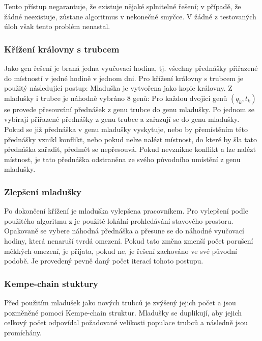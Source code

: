 \documentclass[12pt, a4paper]{article}
\begin{document}
Tento přístup negarantuje, že existuje nějaké splnitelné řešení; v případě, že žádné neexistuje, zůstane algoritmus v nekonečné smyčce.
V žádné z testovaných úloh však tento problém nenastal.

\subsubsection{Křížení královny s trubcem}
Jako gen řešení je braná jedna vyučovací hodina, tj. všechny přednášky přiřazené do místností v jedné hodině v jednom dni.
Pro křížení královny s trubcem je použitý následující postup:
Mladuška je vytvořena jako kopie královny.
Z mladušky i trubce je náhodně vybráno 8 genů:
Pro každou dvojici genů $(q_k, t_k)$ se provede přesouvání přednášek z genu trubce do genu mladušky.
Po jednom se vybírají přiřazené přednášky z genu trubce a zařazují se do genu mladušky.
Pokud se již přednáška v genu mladušky vyskytuje, nebo by přemístěním této přednášky vznikl konflikt, nebo pokud nelze nalézt místnost, do které by šla tato přednáška zařadit,
předmět se nepřesouvá. Pokud nevznikne konflikt a lze nalézt místnost, je tato přednáška odstraněna ze svého původního umístění z genu mladušky.

\subsubsection{Zlepšení mladušky}
Po dokončení křížení je mladuška vylepšena pracovníkem.
Pro vylepšení podle použitého algoritmu z \cite{HoneyBee} je použité lokální prohledávání stavového prostoru.
Opakovaně se vybere náhodná přednáška a přesune se do náhodné vyučovací hodiny, která nenaruší tvrdá omezení.
Pokud tato změna zmenší počet porušení měkkých omezení, je přijata, pokud ne, je řešení zachováno ve své původní podobě.
Je provedený pevně daný počet iterací tohoto postupu.

\subsubsection{Kempe-chain stuktury}
Před použitím mladušek jako nových trubců je zvýšený jejich počet a jsou pozměněné pomocí Kempe-chain struktur.
Mladušky se duplikují, aby jejich celkový počet odpovídal požadované velikosti populace trubců a následně jsou promíchány.
\end{document}
